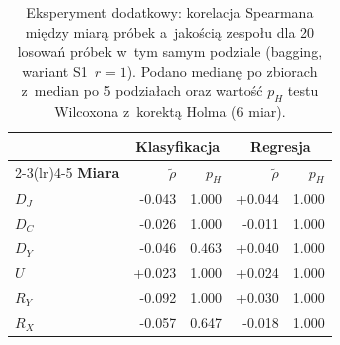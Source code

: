 \begin{table}[!htbp]
\centering\small
\caption{Eksperyment dodatkowy: korelacja Spearmana między miarą próbek a~jakością zespołu dla 20 losowań próbek w~tym samym podziale (bagging, wariant S1~$r=1$). Podano medianę po zbiorach z~median po 5 podziałach oraz wartość $p_H$ testu Wilcoxona z~korektą Holma (6 miar).}
\label{tab:losowania}
\begin{tabular}{lrrrr}
\toprule
& \multicolumn{2}{c}{\textbf{Klasyfikacja}} & \multicolumn{2}{c}{\textbf{Regresja}} \\
\cmidrule(lr){2-3}\cmidrule(lr){4-5}
\textbf{Miara} & $\tilde\rho$ & $p_H$ & $\tilde\rho$ & $p_H$ \\
\midrule
$D_J$ & -0.043 & 1.000 & +0.044 & 1.000 \\
$D_C$ & -0.026 & 1.000 & -0.011 & 1.000 \\
$D_Y$ & -0.046 & 0.463 & +0.040 & 1.000 \\
$U$ & +0.023 & 1.000 & +0.024 & 1.000 \\
$R_Y$ & -0.092 & 1.000 & +0.030 & 1.000 \\
$R_X$ & -0.057 & 0.647 & -0.018 & 1.000 \\
\bottomrule
\end{tabular}
\end{table}

